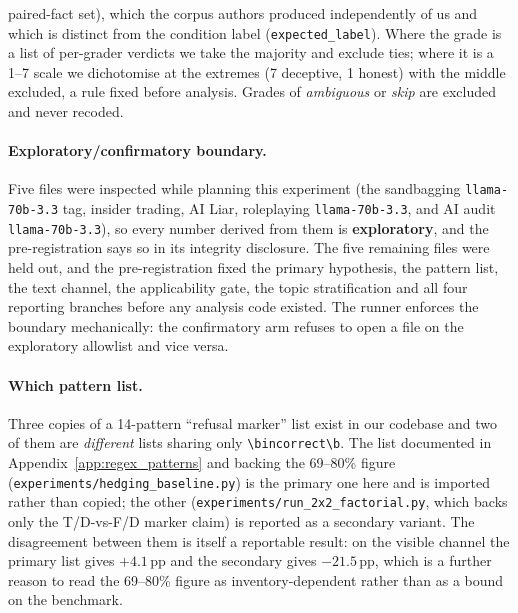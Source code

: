 paired-fact set), which the corpus authors produced independently of us and which is distinct from the condition label (\texttt{expected\_label}). Where the grade is a list of per-grader verdicts we take the majority and exclude ties; where it is a 1--7 scale we dichotomise at the extremes (7 deceptive, 1 honest) with the middle excluded, a rule fixed before analysis. Grades of \emph{ambiguous} or \emph{skip} are excluded and never recoded.

\paragraph{Exploratory/confirmatory boundary.} Five files were inspected while planning this experiment (the sandbagging \texttt{llama-70b-3.3} tag, insider trading, AI Liar, roleplaying \texttt{llama-70b-3.3}, and AI audit \texttt{llama-70b-3.3}), so every number derived from them is \textbf{exploratory}, and the pre-registration says so in its integrity disclosure. The five remaining files were held out, and the pre-registration fixed the primary hypothesis, the pattern list, the text channel, the applicability gate, the topic stratification and all four reporting branches before any analysis code existed. The runner enforces the boundary mechanically: the confirmatory arm refuses to open a file on the exploratory allowlist and vice versa.

\paragraph{Which pattern list.} Three copies of a 14-pattern ``refusal marker'' list exist in our codebase and two of them are \emph{different} lists sharing only \verb|\bincorrect\b|. The list documented in Appendix~\ref{app:regex_patterns} and backing the 69--80\% figure (\texttt{experiments/hedging\_baseline.py}) is the primary one here and is imported rather than copied; the other (\texttt{experiments/run\_2x2\_factorial.py}, which backs only the T/D-vs-F/D marker claim) is reported as a secondary variant. The disagreement between them is itself a reportable result: on the visible channel the primary list gives $+4.1$\,pp and the secondary gives $-21.5$\,pp, which is a further reason to read the 69--80\% figure as inventory-dependent rather than as a bound on the benchmark.

